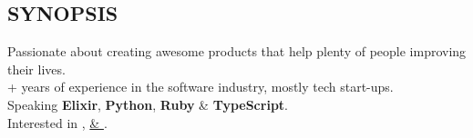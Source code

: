 \subsection*{SYNOPSIS}

\tbullet Passionate about creating awesome products that help plenty of people improving their lives. \\
+ years of experience in the software industry, mostly tech start-ups. \\
\tbullet Speaking \textbf{Elixir}, \textbf{Python}, \textbf{Ruby} \& \textbf{TypeScript}. \\
\tbullet Interested in \href{https://github.com/ethan605/aws-vpn-client}{},
         \href{https://xkpasswd.ethanify.me}{ \& }.
